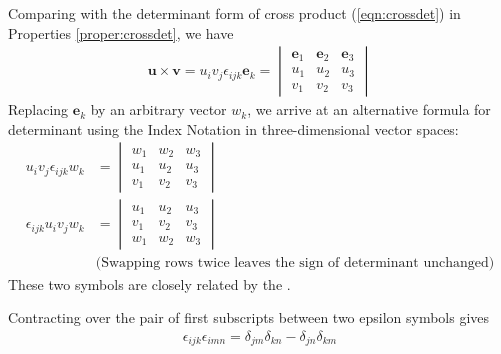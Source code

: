 Comparing with the determinant form of cross product (\ref{eqn:crossdet}) in Properties \ref{proper:crossdet}, we have
\begin{align}
\textbf{u} \times \textbf{v} = u_iv_j \epsilon_{ijk} \textbf{e}_k = 
\begin{vmatrix}
\textbf{e}_1 & \textbf{e}_2 & \textbf{e}_3 \\
u_1 & u_2 & u_3 \\
v_1 & v_2 & v_3
\end{vmatrix}
\label{eqn:crosstens}
\end{align}
Replacing $\textbf{e}_k$ by an arbitrary vector $w_k$, we arrive at an alternative formula for determinant using the Index Notation in three-dimensional vector spaces:
\begin{align}
u_iv_j \epsilon_{ijk} w_k &= 
\begin{vmatrix}
w_1 & w_2 & w_3 \\
u_1 & u_2 & u_3 \\
v_1 & v_2 & v_3
\end{vmatrix}  \nonumber \\
\epsilon_{ijk}  u_iv_jw_k &= 
\begin{vmatrix}
u_1 & u_2 & u_3 \\
v_1 & v_2 & v_3 \\
w_1 & w_2 & w_3
\end{vmatrix} \label{eqn:determinanteps1} \\
& \text{(Swapping rows twice leaves the sign of determinant unchanged)} \nonumber
\end{align}
These two symbols are closely related by the .
\begin{proper} 
\label{proper:epsdel} Contracting over the pair of first subscripts between two epsilon symbols gives 
\begin{align}
\epsilon_{ijk}\epsilon_{imn} = \delta_{jm}\delta_{kn} - \delta_{jn}\delta_{km} \label{eqn:epsdel}
\end{align}
\end{proper}
